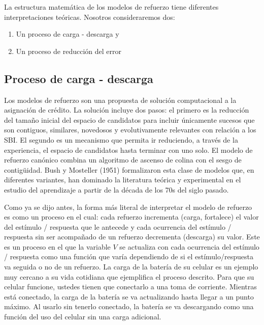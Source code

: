 \documentclass[
  a4paper,
  DIV=11,
  numbers=noendperiod]{scrreprt}
\providecommand{\tightlist}{%
  \setlength{\itemsep}{0pt}\setlength{\parskip}{0pt}}\usepackage{longtable,booktabs,array}
\begin{document}
La estructura matemática de los modelos de refuerzo tiene diferentes
interpretaciones teóricas. Nosotros consideraremos dos:

\begin{enumerate}
\def\labelenumi{\arabic{enumi}.}
\tightlist
\item
  Un proceso de carga - descarga y
\item
  Un proceso de reducción del error
\end{enumerate}

\subsection{Proceso de carga -
descarga}\label{proceso-de-carga---descarga}

Los modelos de refuerzo son una propuesta de solución computacional a la
asignación de crédito. La solución incluye dos pasos: el primero es la
reducción del tamaño inicial del espacio de candidatos para incluir
únicamente sucesos que son contiguos, similares, novedosos y
evolutivamente relevantes con relación a los SBI. El segundo es un
mecanismo que permita ir reduciendo, a través de la experiencia, el
espacio de candidatos hasta terminar con uno solo. El modelo de refuerzo
canónico combina un algoritmo de ascenso de colina con el sesgo de
contigüidad. Bush y Mosteller (1951) formalizaron esta clase de modelos
que, en diferentes variantes, han dominado la literatura teórica y
experimental en el estudio del aprendizaje a partir de la década de los
70s del siglo pasado.

Como ya se dijo antes, la forma más literal de interpretar el modelo de
refuerzo es como un proceso en el cual: cada refuerzo incrementa (carga,
fortalece) el valor del estímulo / respuesta que le antecede y cada
ocurrencia del estímulo / respuesta sin ser acompañado de un refuerzo
decrementa (descarga) su valor. Este es un proceso en el que la variable
\(V\) se actualiza con cada ocurrencia del estímulo / respuesta como una
función que varía dependiendo de si el estímulo/respuesta va seguida o
no de un refuerzo. La carga de la batería de su celular es un ejemplo
muy cercano a su vida cotidiana que ejemplifica el proceso descrito.
Para que su celular funcione, ustedes tienen que conectarlo a una toma
de corriente. Mientras está conectado, la carga de la batería se va
actualizando hasta llegar a un punto máximo. Al usarlo sin tenerlo
conectado, la batería se va descargando como una función del uso del
celular sin una carga adicional.
\end{document}
